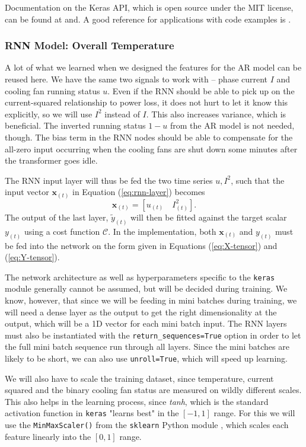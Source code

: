 \documentclass[]{article}
\begin{document}
Documentation on the Keras API, which is open source under the MIT license, can be found at \cite{keras-url} and. A good reference for applications with code examples is \cite{geron2019hands}.

\subsubsection{RNN Model: Overall Temperature} \label{sec:rnn-model-overall}
A lot of what we learned when we designed the features for the AR model can be reused here. We have the same two signals to work with -- phase current $I$ and cooling fan running status $u$. Even if the RNN should be able to pick up on the current-squared relationship to power loss, it does not hurt to let it know this explicitly, so we will use $I^2$ instead of $I$. This also increases variance, which is beneficial. The inverted running status $1 - u$ from the AR model is not needed, though. The bias term in the RNN nodes should be able to compensate for the all-zero input occurring when the cooling fans are shut down some minutes after the transformer goes idle.

The RNN input layer will thus be fed the two time series $u, I^2$, such that the input vector $\mathbf{x}_{(t)}$ in Equation (\ref{eq:rnn-layer}) becomes
\begin{equation}
	\mathbf{x}_{(t)} = [u_{(t)} \quad I^2_{(t)}].
\end{equation}
The output of the last layer, $\tilde{y}_{(t)}$ will then be fitted against the target scalar $y_{(t)}$ using a cost function $\mathcal{C}$. In the implementation, both $\mathbf{x}_{(t)}$ and $y_{(t)}$ must be fed into the network on the form given in Equations (\ref{eq:X-tensor}) and (\ref{eq:Y-tensor}).

The network architecture as well as hyperparameters specific to the \lstinline|keras| module generally cannot be assumed, but will be decided during training. We know, however, that since we will be feeding in mini batches during training, we will need a dense layer as the output to get the right dimensionality at the output, which will be a 1D vector for each mini batch input. The RNN layers must also be instantiated with the \lstinline|return_sequences=True| option in order to let the full mini batch sequence run through all layers. Since the mini batches are likely to be short, we can also use \lstinline|unroll=True|, which will speed up learning.

We will also have to scale the training dataset, since temperature, current squared and the binary cooling fan status are measured on wildly different scales. This also helps in the learning process, since \textit{tanh}, which is the standard activation function in \lstinline|keras| "learns best" in the $[-1,1]$ range. For this we will use the \lstinline|MinMaxScaler()| from the \lstinline|sklearn| Python module \cite{skl}, which scales each feature linearly into the $[0,1]$ range.
\end{document}
